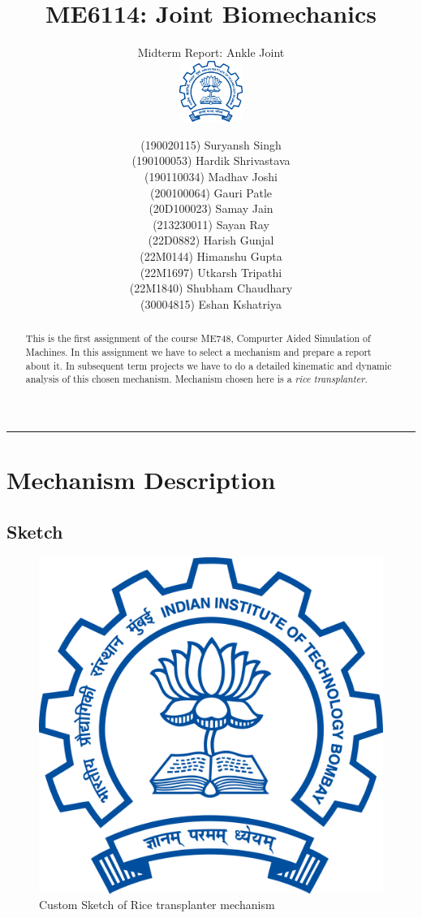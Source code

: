 \documentclass[a4paper,latin,center,onecolumn]{paper}
\title{ME6114: Joint Biomechanics}
\subtitle{Midterm Report: Ankle Joint \\
\hfill\includegraphics[height=2cm]{Images/Indian_Institute_of_Technology_Bombay_Logo.png}
\vspace{-2cm}}
\author{(190020115)	Suryansh Singh \\
        (190100053) Hardik Shrivastava \\
        (190110034) Madhav Joshi \\
        (200100064)	Gauri Patle \\ 
        (20D100023) Samay Jain \\
        (213230011)	Sayan Ray \\ 
        (22D0882) 	Harish Gunjal \\
        (22M0144) 	Himanshu Gupta \\
        (22M1697) 	Utkarsh Tripathi \\
        (22M1840) 	Shubham Chaudhary \\ 
        (30004815)  Eshan Kshatriya}
\begin{document}
    \onecolumn\maketitle 
    \hrule 
    \bigskip

    \begin{abstract}
        This is the first assignment of the course ME748, Compurter Aided Simulation of Machines. In this assignment we have to select a mechanism and prepare a report about it. In subsequent term projects we have to do a detailed kinematic and dynamic analysis of this chosen mechanism. Mechanism chosen here is a \it{rice transplanter}.
    \end{abstract}

    \smalltableofcontents

    \section{Mechanism Description} 
        \subsection{Sketch}
            \begin{figure}[hbt!]
                \centering
                \includegraphics[width=0.6\columnwidth]{Images/Indian_Institute_of_Technology_Bombay_Logo.png}
                \caption{Custom Sketch of Rice transplanter mechanism}
                \label{fig:mySketch}
            \end{figure}
            
\end{document}
